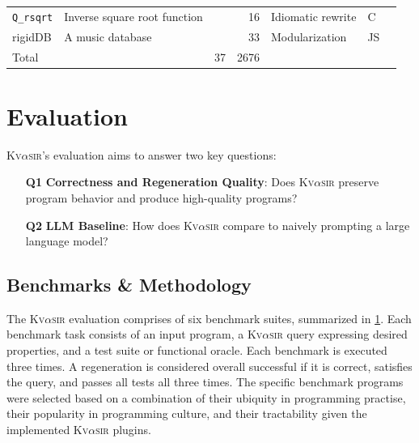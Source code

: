 \documentclass[nonacm,sigplan]{acmart}
\newcommand{\sys}{{\scshape Kv{$\alpha$}sir}\xspace}
\newcommand{\ttt}[1]{\texttt{#1}\xspace}
\begin{document}
\begin{table}[t]
\begin{tabular*}{\textwidth}{llrrlll}
\hspace{.5em} \ttt{Q\_rsqrt}       & Inverse square root function             &    & 16  & Idiomatic rewrite      & C & \cite{fast_inv_sqrt}  \\
\hspace{.5em} \textsf{rigidDB}     & A music database &    & 33  & Modularization         & JS & \cite{codewithsadeemusicplayer} \\
\midrule
Total                              &                                          & 37 & 2676&                        & & \\
\bottomrule
\end{tabular*}
\label{tab:benchmarks}
\end{table}


\section{Evaluation}
\label{sec:evaluation}

\sys's evaluation aims to answer two key questions: 

\begin{itemize}
  \item[\textbf{Q1}] \textbf{Correctness and Regeneration Quality}: Does \sys preserve program behavior and produce high-quality programs?
  \item[\textbf{Q2}] \textbf{LLM Baseline}: How does \sys compare to naively prompting a large language model?
\end{itemize}



\subsection{Benchmarks \& Methodology}

The \sys evaluation comprises of six benchmark suites, summarized in \cref{tab:benchmarks}.
Each benchmark task consists of an input program, a \sys query expressing desired
properties, and a test suite or functional oracle.
Each benchmark is executed three times. A regeneration is considered overall successful 
if it is correct, satisfies the query, and passes all tests all three times.
The specific benchmark programs were selected based on a combination of their ubiquity in programming practise, their
popularity in programming culture, and their tractability given the implemented \sys plugins.
\end{document}
